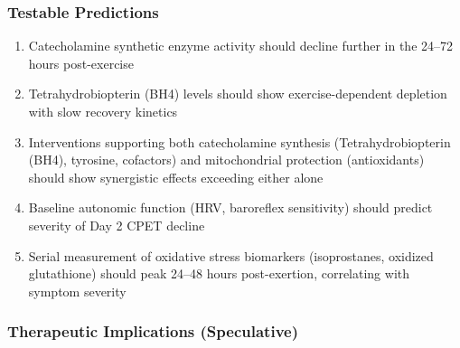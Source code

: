\subsubsection{Testable Predictions}

\begin{enumerate}
    \item Catecholamine synthetic enzyme activity should decline further in the 24--72 hours post-exercise
    \item Tetrahydrobiopterin (BH4) levels should show exercise-dependent depletion with slow recovery kinetics
    \item Interventions supporting both catecholamine synthesis (Tetrahydrobiopterin (BH4), tyrosine, cofactors) and mitochondrial protection (antioxidants) should show synergistic effects exceeding either alone
    \item Baseline autonomic function (HRV, baroreflex sensitivity) should predict severity of Day 2 CPET decline
    \item Serial measurement of oxidative stress biomarkers (isoprostanes, oxidized glutathione) should peak 24--48 hours post-exertion, correlating with symptom severity
\end{enumerate}

\subsubsection{Therapeutic Implications (Speculative)}

